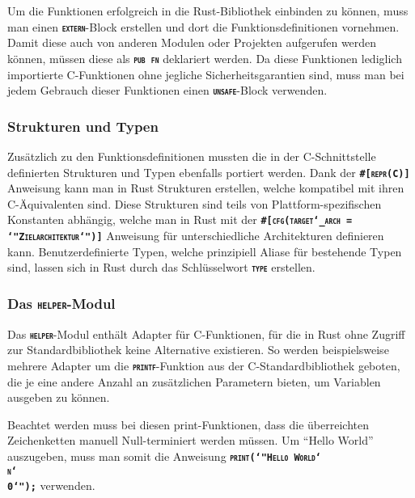Um die Funktionen erfolgreich in die Rust-Bibliothek einbinden zu können,
muss man einen \texttt{\textsc{\textbf{extern}}}-Block erstellen und dort
die Funktionsdefinitionen vornehmen.
Damit diese auch von anderen Modulen oder Projekten aufgerufen werden können, müssen diese
als \texttt{\textsc{\textbf{pub fn}}} deklariert werden.
Da diese Funktionen lediglich importierte C-Funktionen ohne jegliche Sicherheitsgarantien
sind, muss man bei jedem Gebrauch dieser Funktionen einen \texttt{\textsc{\textbf{unsafe}}}-Block verwenden.

\subsubsection{Strukturen und Typen}

Zusätzlich zu den Funktionsdefinitionen mussten die in der C-Schnittstelle definierten
Strukturen und Typen ebenfalls portiert werden.
Dank der \texttt{\textsc{\textbf{\#[repr(C)]}}} Anweisung kann man in Rust Strukturen erstellen,
welche kompatibel mit ihren C-Äquivalenten sind.
Diese Strukturen sind teils von Plattform-spezifischen Konstanten abhängig, welche man in Rust mit der
\texttt{\textsc{\textbf{\#[cfg(target\char`_arch = \char`"Zielarchitektur\char`")]}}} Anweisung
für unterschiedliche Architekturen definieren kann.
Benutzerdefinierte Typen, welche prinzipiell Aliase für bestehende Typen sind, lassen sich in Rust durch das
Schlüsselwort \texttt{\textsc{\textbf{type}}} erstellen.

\subsubsection{Das \texttt{\textsc{\textbf{helper}}}-Modul}

Das \texttt{\textsc{\textbf{helper}}}-Modul enthält Adapter für C-Funktionen,
für die in Rust ohne Zugriff zur Standardbibliothek keine Alternative existieren.
So werden beispielsweise mehrere Adapter um die \texttt{\textsc{\textbf{printf}}}-Funktion aus der C-Standardbibliothek
geboten,  die je eine andere Anzahl an zusätzlichen Parametern bieten, um Variablen ausgeben zu können.

Beachtet werden muss bei diesen print-Funktionen, dass die überreichten Zeichenketten manuell
Null-terminiert werden müssen. Um "`Hello World"' auszugeben, muss man somit die Anweisung
\texttt{\textsc{\textbf{print(\char`"Hello World\char`\\n\char`\\0\char`");}}} verwenden.

